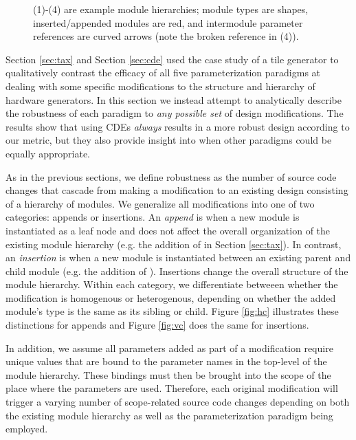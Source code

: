 \begin{figure}
\centering
{}
\caption{(1)-(4) are example module hierarchies; module types are shapes, inserted/appended modules are red, and intermodule parameter references are curved arrows (note the broken reference in (4)).}
\label{fig:attr}
\end{figure}

Section \ref{sec:tax} and Section \ref{sec:cde} used the case study of a tile generator to qualitatively contrast the efficacy of all five parameterization paradigms
at dealing with some specific modifications to the structure and hierarchy of hardware generators.
In this section we instead attempt to analytically describe the robustness of each paradigm to \textit{any possible set} of design modifications.
The results show that using CDEs \textit{always} results in a more robust design according to our metric,
but they also provide insight into when other paradigms could be equally appropriate.

As in the previous sections, we define robustness as the number of source code changes that cascade from making a modification to an existing design
consisting of a hierarchy of modules.
We generalize all modifications into one of two categories: appends or insertions.
An \emph{append} is when a new module is instantiated as a leaf node and does not affect the overall organization of the existing module hierarchy (e.g. the addition of  in Section \ref{sec:tax}).
In contrast, an \emph{insertion} is when a new module is instantiated between an existing parent and child module (e.g. the addition of ). 
Insertions change the overall structure of the module hierarchy.
Within each category, we differentiate betweeen whether the modification is homogenous or heterogenous, depending on whether the added module's type is the same as its sibling or child.
Figure \ref{fig:hc} illustrates these distinctions for appends and Figure \ref{fig:vc} does the same for insertions.

In addition, we assume all parameters added as part of a modification require unique values that are bound to the parameter names in the top-level of the module hierarchy.
These bindings must then be brought into the scope of the place where the parameters are used.
Therefore, each original modification will trigger a varying number of scope-related source code changes
depending on both the existing module hierarchy as well as the parameterization paradigm being employed.

